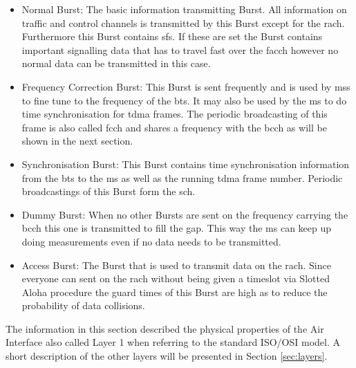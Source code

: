 \begin{itemize}
	\item Normal Burst: The basic information transmitting Burst.
	All information on traffic and control channels is transmitted by this Burst except for the \gls{rach}.
	Furthermore this Burst contains \glspl{sf}.
	If these are set the Burst contains important signalling data that has to travel fast over the \gls{facch} however no normal data can be transmitted in this case.
	\item Frequency Correction Burst: This Burst is sent frequently and is used by \glspl{ms} to fine tune to the frequency of the \gls{bts}.
	It may also be used by the \gls{ms} to do time synchronisation for \gls{tdma} frames.
	The periodic broadcasting of this frame is also called \gls{fcch} and shares a frequency with the \gls{bcch} as will be shown in the next section.
	\item Synchronisation Burst: This Burst contains time synchronisation information from the \gls{bts} to the \gls{ms} as well as the running \gls{tdma} frame number.
	Periodic broadcastings of this Burst form the \gls{sch}.
	\item Dummy Burst: When no other Bursts are sent on the frequency carrying the \gls{bcch} this one is transmitted to fill the gap.
	This way the \gls{ms} can keep up doing measurements even if no data needs to be transmitted.
	\item Access Burst: The Burst that is used to transmit data on the \gls{rach}.
	Since everyone can sent on the \gls{rach} without being given a timeslot via Slotted Aloha procedure the guard times of this Burst are high as to reduce the probability of data collisions.
\end{itemize}
The information in this section described the physical properties of the Air Interface also called Layer 1 when referring to the standard ISO/OSI model.
A short description of the other layers will be presented in Section \ref{sec:layers}.

